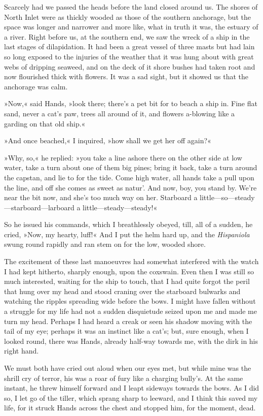 Scarcely had we passed the heads before the land closed around us. The shores of North Inlet were as thickly wooded as those of the southern anchorage, but the space was longer and narrower and more like, what in truth it was, the estuary of a river. Right before us, at the southern end, we saw the wreck of a ship in the last stages of dilapidation. It had been a great vessel of three masts but had lain so long exposed to the injuries of the weather that it was hung about with great webs of dripping seaweed, and on the deck of it shore bushes had taken root and now flourished thick with flowers. It was a sad sight, but it showed us that the anchorage was calm.

»Now,« said Hands, »look there; there's a pet bit for to beach a ship in. Fine flat sand, never a cat's paw, trees all around of it, and flowers a-blowing like a garding on that old ship.«

»And once beached,« I inquired, »how shall we get her off again?«

»Why, so,« he replied: »you take a line ashore there on the other side at low water, take a turn about one of them big pines; bring it back, take a turn around the capstan, and lie to for the tide. Come high water, all hands take a pull upon the line, and off she comes as sweet as natur'. And now, boy, you stand by. We're near the bit now, and she's too much way on her. Starboard a little—so—steady—starboard—larboard a little—steady—steady!«

So he issued his commands, which I breathlessly obeyed, till, all of a sudden, he cried, »Now, my hearty, luff!« And I put the helm hard up, and the \textit{Hispaniola} swung round rapidly and ran stem on for the low, wooded shore.

The excitement of these last manoeuvres had somewhat interfered with the watch I had kept hitherto, sharply enough, upon the coxswain. Even then I was still so much interested, waiting for the ship to touch, that I had quite forgot the peril that hung over my head and stood craning over the starboard bulwarks and watching the ripples spreading wide before the bows. I might have fallen without a struggle for my life had not a sudden disquietude seized upon me and made me turn my head. Perhaps I had heard a creak or seen his shadow moving with the tail of my eye; perhaps it was an instinct like a cat's; but, sure enough, when I looked round, there was Hands, already half-way towards me, with the dirk in his right hand.

We must both have cried out aloud when our eyes met, but while mine was the shrill cry of terror, his was a roar of fury like a charging bully's. At the same instant, he threw himself forward and I leapt sideways towards the bows. As I did so, I let go of the tiller, which sprang sharp to leeward, and I think this saved my life, for it struck Hands across the chest and stopped him, for the moment, dead.

